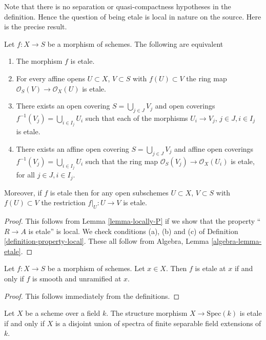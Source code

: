 \medskip\noindent
Note that there is no separation or quasi-compactness hypotheses in the
definition. Hence the question of being etale is local in nature on
the source. Here is the precise result.

\begin{lemma}
\label{lemma-etale-characterize}
Let $f : X \to S$ be a morphism of schemes.
The following are equivalent
\begin{enumerate}
\item The morphism $f$ is etale.
\item For every affine opens $U \subset X$, $V \subset S$
with $f(U) \subset V$ the ring map
$\mathcal{O}_S(V) \to \mathcal{O}_X(U)$ is etale.
\item There exists an open covering $S = \bigcup_{j \in J} V_j$
and open coverings $f^{-1}(V_j) = \bigcup_{i \in I_j} U_i$ such
that each of the morphisms $U_i \to V_j$, $j\in J, i\in I_j$
is etale.
\item There exists an affine open covering $S = \bigcup_{j \in J} V_j$
and affine open coverings $f^{-1}(V_j) = \bigcup_{i \in I_j} U_i$ such
that the ring map $\mathcal{O}_S(V_j) \to \mathcal{O}_X(U_i)$ is
etale, for all $j\in J, i\in I_j$.
\end{enumerate}
Moreover, if $f$ is etale then for
any open subschemes $U \subset X$, $V \subset S$ with $f(U) \subset V$
the restriction $f|_U : U \to V$ is etale.
\end{lemma}

\begin{proof}
This follows from Lemma \ref{lemma-locally-P} if we show that
the property ``$R \to A$ is etale'' is local.
We check conditions (a), (b) and (c) of Definition
\ref{definition-property-local}.
These all follow from Algebra, Lemma \ref{algebra-lemma-etale}.
\end{proof}

\begin{lemma}
\label{lemma-etale-smooth-unramified}
Let $f : X \to S$ be a morphism of schemes.
Let $x \in X$. Then $f$ is etale at $x$ if and only if $f$ is
smooth and unramified at $x$.
\end{lemma}

\begin{proof}
This follows immediately from the definitions.
\end{proof}

\begin{lemma}
\label{lemma-etale-over-field}
Let $X$ be a scheme over a field $k$.
The structure morphism $X \to \text{Spec}(k)$ is etale if
and only if $X$ is a disjoint union of spectra of finite separable
field extensions of $k$.
\end{lemma}

